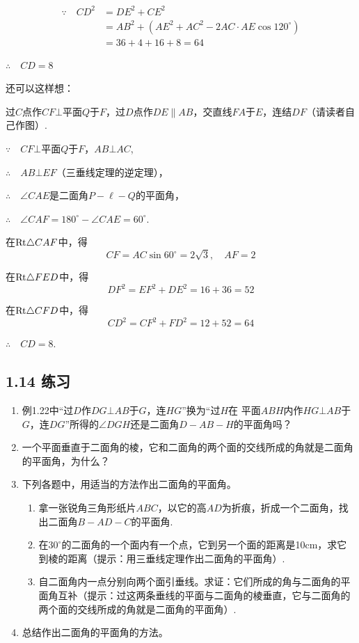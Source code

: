 \begin{solution}
\[\begin{split}
\because\quad CD^2&=DE^2+CE^2\\
&=AB^2+\left(AE^2+AC^2-2AC\cdot AE\cos120^{\circ}\right)\\
&=36+4+16+8=64
\end{split}\]

$\therefore\quad CD=8$

还可以这样想：

过$C$点作$CF\bot $平面$Q$于$F$，过$D$点作$DE\parallel AB$，交直线$FA$于$E$，连结$DF$（请读者自己作图）.

$\because\quad CF\bot $平面$Q$于$F$，$AB\bot AC$,

$\therefore\quad AB\bot EF$（三垂线定理的逆定理），

$\therefore\quad \angle CAE$是二面角$P-\ell-Q$的平面角，

$\therefore\quad \angle CAF=180^{\circ}-\angle CAE=60^{\circ}$.

在${\rm Rt}\triangle CAF$中，得
\[CF=AC\sin60^{\circ}=2\sqrt{3},\quad AF=2\]

在${\rm Rt}\triangle FED$中，得
\[DF^2=EF^2+DE^2=16+36=52\]

在${\rm Rt}\triangle CFD$中，得
\[CD^2=CF^2+FD^2=12+52=64\]

$\therefore\quad CD=8$.
\end{solution}

\subsection*{1.14 练习}
\begin{enumerate}
\item 例1.22中“过$D$作$DG\bot AB$于$G$，连$HG$”换为“过$H$在
平面$ABH$内作$HG\bot AB$于$G$，连$DG$”所得的$\angle DGH$还是二面角$D-AB-H$的平面角吗？
\item 一个平面垂直于二面角的棱，它和二面角的两个面的交线所成的角就是二面角的平面角，为什么？
\item 下列各题中，用适当的方法作出二面角的平面角。
\begin{enumerate}[(1)]
\item 拿一张锐角三角形纸片$ABC$，以它的高$AD$为折痕，折成一个二面角，找出二面角$B-AD-C$的平面角.
\item 在$30^{\circ}$的二面角的一个面内有一个点，它到另一个面的距离是10cm，求它到棱的距离（提示：用三垂线定理作出二面角的平面角）.
\item 自二面角内一点分别向两个面引垂线。求证：它们所成的角与二面角的平面角互补（提示：过这两条垂线的平面与二面角的棱垂直，它与二面角的两个面的交线所成的角就是二面角的平面角）.
\end{enumerate}

\item 总结作出二面角的平面角的方法。
\end{enumerate}

